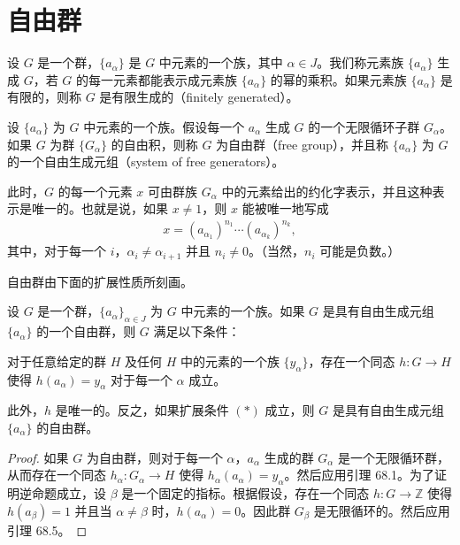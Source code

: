 \documentclass[../../main.tex]{subfiles}
\begin{document}
\section{自由群}\label{section:ch11-自由群}

设 $G$ 是一个群，$\{a_\alpha\}$ 是 $G$ 中元素的一个族，其中 $\alpha\in J$。我们称元素族 $\{a_\alpha\}$ 生成 $G$，若 $G$ 的每一元素都能表示成元素族 $\{a_\alpha\}$ 的幂的乘积。如果元素族 $\{a_\alpha\}$ 是有限的，则称 $G$ 是有限生成的（finitely generated）。

\begin{definition}[自由群]\label{definition:ch11-free-group}
设 $\{a_\alpha\}$ 为 $G$ 中元素的一个族。假设每一个 $a_\alpha$ 生成 $G$ 的一个无限循环子群 $G_\alpha$。如果 $G$ 为群 $\{G_\alpha\}$ 的自由积，则称 $G$ 为自由群（free group），并且称 $\{a_\alpha\}$ 为 $G$ 的一个自由生成元组（system of free generators）。
\end{definition}

此时，$G$ 的每一个元素 $x$ 可由群族 $G_\alpha$ 中的元素给出的约化字表示，并且这种表示是唯一的。也就是说，如果 $x\neq 1$，则 $x$ 能被唯一地写成
\begin{align*}
x=(a_{\alpha_1})^{n_1}\cdots(a_{\alpha_k})^{n_k},
\end{align*}
其中，对于每一个 $i$，$\alpha_i\neq\alpha_{i+1}$ 并且 $n_i\neq 0$。（当然，$n_i$ 可能是负数。）

自由群由下面的扩展性质所刻画。

\begin{lemma}[自由群的扩展性质]\label{lemma:ch11-free-group-extension}
设 $G$ 是一个群，$\{a_\alpha\}_{\alpha\in J}$ 为 $G$ 中元素的一个族。如果 $G$ 是具有自由生成元组 $\{a_\alpha\}$ 的一个自由群，则 $G$ 满足以下条件：

对于任意给定的群 $H$ 及任何 $H$ 中的元素的一个族 $\{y_\alpha\}$，存在一个同态 $h:G\to H$ 使得 $h(a_\alpha)=y_\alpha$ 对于每一个 $\alpha$ 成立。

此外，$h$ 是唯一的。反之，如果扩展条件 $(*)$ 成立，则 $G$ 是具有自由生成元组 $\{a_\alpha\}$ 的自由群。
\end{lemma}

\begin{proof}
如果 $G$ 为自由群，则对于每一个 $\alpha$，$a_\alpha$ 生成的群 $G_\alpha$ 是一个无限循环群，从而存在一个同态 $h_\alpha:G_\alpha\to H$ 使得 $h_\alpha(a_\alpha)=y_\alpha$。然后应用引理 68.1。为了证明逆命题成立，设 $\beta$ 是一个固定的指标。根据假设，存在一个同态 $h:G\to\mathbb{Z}$ 使得 $h(a_\beta)=1$ 并且当 $\alpha\neq\beta$ 时，$h(a_\alpha)=0$。因此群 $G_\beta$ 是无限循环的。然后应用引理 68.5。
\end{proof}
\end{document}
